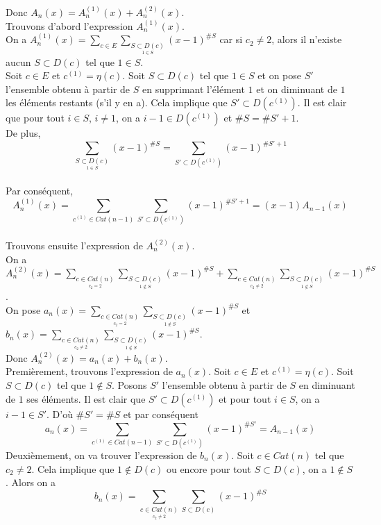 Donc $A_{n}(x) = A_{n}^{(1)}(x) + A_{n}^{(2)}(x)$.\vspace{15pt}\\
Trouvons d'abord l'expression $A_{n}^{(1)}(x)$.\\
On a $A_{n}^{(1)}(x) = \sum\limits_{c \in E}\sum\limits_{\underset{1\in S}{S\subset D(c)}}(x-1)^{{\#S}}$ car si $c_{2}\neq 2$, alors il n'existe aucun $S\subset D(c)$ tel que $1\in S$. \\
Soit $c\in E$ et $c^{(1)}=\eta(c)$. Soit $S\subset D(c)$ tel que $1\in S$ et on pose $S'$ l'ensemble obtenu à partir de $S$ en supprimant l'élément $1$ et on diminuant de $1$ les éléments restants (s'il y en a). Cela implique que $S'\subset D(c^{(1)})$.
Il est clair que pour tout $i \in S$, $i \neq 1$, on a $i-1 \in  D(c^{(1)})$ et $\#S = \#S' + 1$.\\
De plus, $$\sum \limits_{\underset{1\in S}{S\subset D(c)}}(x-1)^{\#S} = \sum \limits_{S'\subset D(c^{(1)})}(x-1)^{\#S' + 1}$$\\
Par conséquent, $$A_{n}^{(1)}(x)=\sum\limits_{c^{(1)}\in Cat(n-1)}\sum \limits_{S'\subset D(c^{(1)})}(x-1)^{\#S' + 1}=(x-1)A_{n-1}(x)$$\vspace{15pt}\\
Trouvons ensuite l'expression de $A_{n}^{(2)}(x)$.\\
On a $A_{n}^{(2)}(x) = \sum\limits_{\underset{c_{2}=2}{c\in Cat(n)}} \sum\limits_{\underset{1\notin S}{S\subset D(c)}}(x-1)^{\#S} + \sum\limits_{\underset{c_{2}\neq 2}{c\in Cat(n)}} \sum\limits_{\underset{1\notin S}{S\subset D(c)}}(x-1)^{\#S}$.\\
On pose $a_{n}(x)=\sum\limits_{\underset{c_{2}=2}{c\in Cat(n)}} \sum\limits_{\underset{1\notin S}{S\subset D(c)}}(x-1)^{\#S}$ et $b_{n}(x) = \sum\limits_{\underset{c_{2}\neq 2}{c\in Cat(n)}} \sum\limits_{\underset{1\notin S}{S\subset D(c)}}(x-1)^{\#S}$.\\
Donc $A_{n}^{(2)}(x)=a_{n}(x)+b_{n}(x)$.\\
Premièrement, trouvons l'expression de $a_{n}(x)$. Soit $c \in E$ et $c^{(1)} = \eta(c)$. Soit $S\subset D(c)$ tel que $1\notin S$. Posons $S'$ l'ensemble obtenu à partir de $S$ en diminuant de $1$ ses éléments. Il est clair que $S'\subset D(c^{(1)})$ et pour tout $i\in S$, on a $i-1\in S'$. D'où $\#S' = \#S$ et par conséquent $$a_{n}(x) = \sum\limits_{c^{(1)}\in Cat(n-1)} \sum\limits_{S'\subset D(c^{(1)})}(x-1)^{\#S'}=A_{n-1}(x)$$
Deuxièmement, on va trouver l'expression de $b_{n}(x)$. Soit $c\in Cat(n)$ tel que $c_{2}\neq 2$. Cela implique que $1\notin D(c)$ ou encore pour tout $S\subset D(c)$, on a $1\notin S$. Alors on a $$b_{n}(x) = \sum\limits_{\underset{c_{2}\neq 2}{c\in Cat(n)}} \sum\limits_{S\subset D(c)}(x-1)^{\#S}$$\\
